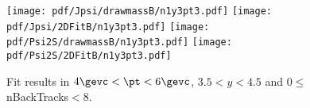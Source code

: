 \begin{figure}[H]
\begin{center}
\texttt{[image: pdf/Jpsi/drawmassB/n1y3pt3.pdf]}
\texttt{[image: pdf/Jpsi/2DFitB/n1y3pt3.pdf]}
\vspace*{-0.5cm}
\texttt{[image: pdf/Psi2S/drawmassB/n1y3pt3.pdf]}
\texttt{[image: pdf/Psi2S/2DFitB/n1y3pt3.pdf]}
\vspace*{-0.5cm}
\end{center}
\caption{Fit results in $4\gevc<\pt<6\gevc$, $3.5<y<4.5$ and 0$\leq$nBackTracks$<$8.}
\label{Fitn1y3pt3}
\end{figure}
